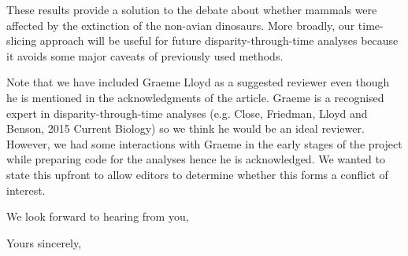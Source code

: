 \documentclass[11pt]{letter}
\begin{document}
\begin{letter}{}
These results provide a solution to the debate about whether mammals were affected by the extinction of the non-avian dinosaurs.
More broadly, our time-slicing approach will be useful for future disparity-through-time analyses because it avoids some major caveats of previously used methods.


Note that we have included Graeme Lloyd as a suggested reviewer even though he is mentioned in the acknowledgments of the article.
Graeme is a recognised expert in disparity-through-time analyses (e.g. Close, Friedman, Lloyd and Benson, 2015 Current Biology) so we think he would be an ideal reviewer.
However, we had some interactions with Graeme in the early stages of the project while preparing code for the analyses hence he is acknowledged.
We wanted to state this upfront to allow editors to determine whether this forms a conflict of interest.

We look forward to hearing from you,

\closing{Yours sincerely,}


\end{letter}
\end{document}
